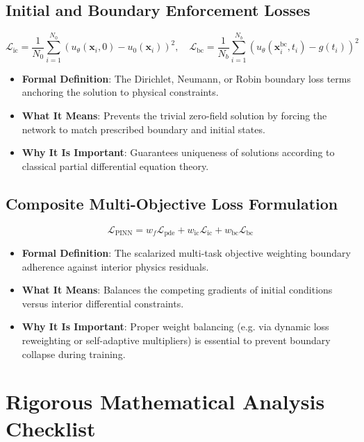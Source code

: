 \documentclass[11pt,a4paper]{article}
\theoremstyle{definition}
\begin{document}
\subsection{Initial and Boundary Enforcement Losses}
{\boldmath
\begin{equation}
\mathcal{L}_{\text{ic}} = \frac{1}{N_0}\sum_{i=1}^{N_0} (u_\theta(\mathbf{x}_i, 0) - u_0(\mathbf{x}_i))^2, \quad \mathcal{L}_{\text{bc}} = \frac{1}{N_b}\sum_{i=1}^{N_b} (u_\theta(\mathbf{x}_i^{\text{bc}}, t_i) - g(t_i))^2
\end{equation}
}
\begin{itemize}
    \item \textbf{Formal Definition}: The Dirichlet, Neumann, or Robin boundary loss terms anchoring the solution to physical constraints.
    \item \textbf{What It Means}: Prevents the trivial zero-field solution by forcing the network to match prescribed boundary and initial states.
    \item \textbf{Why It Is Important}: Guarantees uniqueness of solutions according to classical partial differential equation theory.
\end{itemize}

\subsection{Composite Multi-Objective Loss Formulation}
{\boldmath
\begin{equation}
\mathcal{L}_{\text{PINN}} = w_f \mathcal{L}_{\text{pde}} + w_{\text{ic}} \mathcal{L}_{\text{ic}} + w_{\text{bc}} \mathcal{L}_{\text{bc}}
\end{equation}
}
\begin{itemize}
    \item \textbf{Formal Definition}: The scalarized multi-task objective weighting boundary adherence against interior physics residuals.
    \item \textbf{What It Means}: Balances the competing gradients of initial conditions versus interior differential constraints.
    \item \textbf{Why It Is Important}: Proper weight balancing (e.g. via dynamic loss reweighting or self-adaptive multipliers) is essential to prevent boundary collapse during training.
\end{itemize}

\section{Rigorous Mathematical Analysis Checklist}
\end{document}
